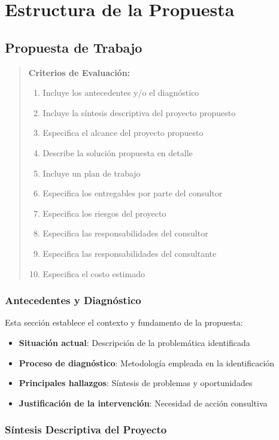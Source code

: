 \documentclass[12pt,letterpaper,oneside]{book}
\newenvironment{criterios}
{\begin{quote}\textbf{Criterios de Evaluación:}\begin{enumerate}}
{\end{enumerate}\end{quote}}
\begin{document}
\section{Estructura de la Propuesta}

\subsection{Propuesta de Trabajo}

\begin{criterios}
\item Incluye los antecedentes y/o el diagnóstico
\item Incluye la síntesis descriptiva del proyecto propuesto
\item Especifica el alcance del proyecto propuesto
\item Describe la solución propuesta en detalle
\item Incluye un plan de trabajo
\item Especifica los entregables por parte del consultor
\item Especifica los riesgos del proyecto
\item Especifica las responsabilidades del consultor
\item Especifica las responsabilidades del consultante
\item Especifica el costo estimado
\end{criterios}

\subsubsection{Antecedentes y Diagnóstico}

Esta sección establece el contexto y fundamento de la propuesta:

\begin{itemize}
\item \textbf{Situación actual}: Descripción de la problemática identificada
\item \textbf{Proceso de diagnóstico}: Metodología empleada en la identificación
\item \textbf{Principales hallazgos}: Síntesis de problemas y oportunidades
\item \textbf{Justificación de la intervención}: Necesidad de acción consultiva
\end{itemize}

\subsubsection{Síntesis Descriptiva del Proyecto}
\end{document}
